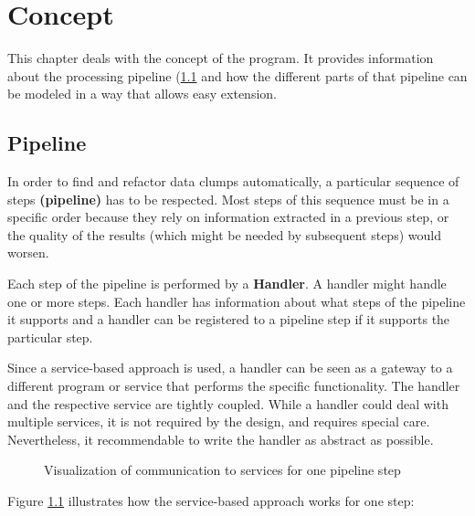 \begingroup
\renewcommand{\cleardoublepage}{} %
\renewcommand{\clearpage}{}
\chapter{Concept}\label{chapter_conception}
\endgroup
This chapter deals with the concept of the program. It provides information about the processing pipeline (\ref{sec:pipeline} and how the different parts of that pipeline can be modeled in a way that allows easy extension. 


\hfill
\section{Pipeline}\label{sec:pipeline}
In order to find and refactor data clumps automatically, a particular sequence of steps \textbf{(pipeline)} has to be respected. Most steps of this sequence must be in a specific order because they rely on information extracted in a previous step, or the quality of the results (which might be needed by subsequent steps) would worsen.

Each step of the pipeline is performed by a  \textbf{Handler}. A handler might handle one or more steps.  Each handler has information about what steps of the pipeline it supports and  a handler can be registered to a pipeline step if it supports the particular step.  

Since a service-based approach is used, a handler can be seen as a gateway to a different program or service that performs the specific functionality.  The handler and the respective service are tightly coupled. While a handler could deal with multiple services, it is not required by the design, and requires special care. Nevertheless, it recommendable to write the handler as abstract as possible.
\begin{figure}
    \centering
    
    \caption{Visualization of communication to services for one pipeline step}
    \label{fig:solver_gateway_service_overview}
\end{figure}

Figure \ref{fig:solver_gateway_service_overview} illustrates how the service-based approach works for one step:

